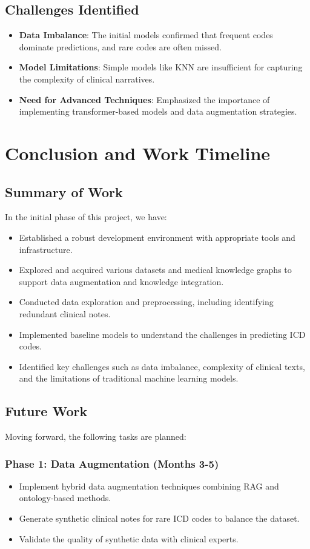 \documentclass[12pt,a4paper]{report}
\begin{document}
\section{Challenges Identified}
\begin{itemize}
    \item \textbf{Data Imbalance}: The initial models confirmed that frequent codes dominate predictions, and rare codes are often missed.
    \item \textbf{Model Limitations}: Simple models like KNN are insufficient for capturing the complexity of clinical narratives.
    \item \textbf{Need for Advanced Techniques}: Emphasized the importance of implementing transformer-based models and data augmentation strategies.
\end{itemize}

\chapter{Conclusion and Work Timeline}

\section{Summary of Work}
In the initial phase of this project, we have:
\begin{itemize}
    \item Established a robust development environment with appropriate tools and infrastructure.
    \item Explored and acquired various datasets and medical knowledge graphs to support data augmentation and knowledge integration.
    \item Conducted data exploration and preprocessing, including identifying redundant clinical notes.
    \item Implemented baseline models to understand the challenges in predicting ICD codes.
    \item Identified key challenges such as data imbalance, complexity of clinical texts, and the limitations of traditional machine learning models.
\end{itemize}

\section{Future Work}
Moving forward, the following tasks are planned:

\subsection{Phase 1: Data Augmentation (Months 3-5)}
\begin{itemize}
    \item Implement hybrid data augmentation techniques combining RAG and ontology-based methods.
    \item Generate synthetic clinical notes for rare ICD codes to balance the dataset.
    \item Validate the quality of synthetic data with clinical experts.
\end{itemize}
\end{document}
